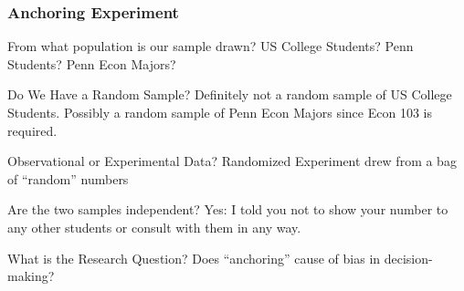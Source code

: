 \begin{frame}
\frametitle{Anchoring Experiment}
\small
\singlespacing
\begin{block}{From what population is our sample drawn?} 
US College Students? Penn Students? Penn Econ Majors? 
\end{block}

\begin{block}{Do We Have a Random Sample?} 
Definitely not a random sample of US College Students. Possibly a random sample of Penn Econ Majors since Econ 103 is required. 
\end{block}


\begin{block}{Observational or Experimental Data?} 
Randomized Experiment drew from a bag of ``random'' numbers 
\end{block}

\begin{block}{Are the two samples independent?}
Yes: I told you not to show your number to any other students or consult with them in any way. 
\end{block}

\begin{block}{What is the Research Question?} 
Does ``anchoring'' cause of bias in decision-making? 
\end{block}
\end{frame}
